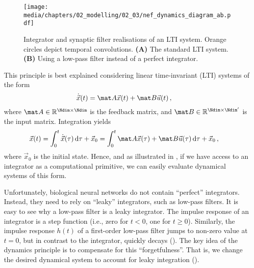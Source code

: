 \begin{figure}
	\centering
	\texttt{[image: media/chapters/02\_modelling/02\_03/nef\_dynamics\_diagram\_ab.pdf]}
	{\label{fig:nef_dynamics_integral}}%
	{\label{fig:nef_dynamics_synaptic}}%
	\caption[Integrator and synaptic filter realisations of an LTI system]{Integrator and synaptic filter realisations of an LTI system. Orange circles depict temporal convolutions.
	\textbf{(A)} The standard LTI system.
	\textbf{(B)} Using a low-pass filter instead of a perfect integrator.}
	\label{fig:nef_dynamics_ab}
\end{figure}

This principle is best explained considering linear time-invariant (LTI) systems of the form
\begin{align*}
	\dot{\vec x}(t) &= \mat A \vec x(t) + \mat B \vec u(t) \,,
\end{align*}
where $\mat A \in \mathbb{R}^{\Ndim \times \Ndim}$ is the feedback matrix, and $\mat B \in \mathbb{R}^{\Ndim \times \Ndim'}$ is the input matrix.
Integration yields
\begin{align}
	\vec x(t)
	&=
		\int_0^t \dot{\vec x}(\tau) \,\mathrm{d}\tau + \vec x_0
	=
		\int_0^t \mat A \vec x(\tau) + \mat B \vec u(\tau) \,\mathrm{d}\tau + \vec x_0 \,,
	\label{eqn:lti_integral_equation}
\end{align}
where $\vec x_0$ is the initial state.
Hence, and as illustrated in , if we have access to an integrator as a computational primitive, we can easily evaluate dynamical systems of this form.

Unfortunately, biological neural networks do not contain \enquote{perfect} integrators.
Instead, they need to rely on \enquote{leaky} integrators, such as low-pass filters.
It is easy to see why a low-pass filter is a leaky integrator.
The impulse response of an integrator is a step function (i.e., zero for $t < 0$, one for $t \geq 0$).
Similarly, the impulse response $h(t)$ of a first-order low-pass filter jumps to non-zero value at $t = 0$, but in contrast to the integrator, quickly decays ().
The key idea of the dynamics principle is to compensate for this \enquote{forgetfulness}.
That is, we change the desired dynamical system to account for leaky integration ().

